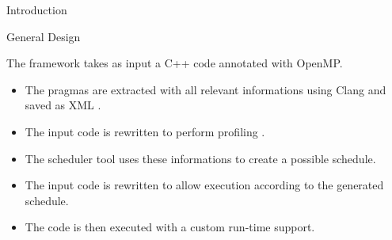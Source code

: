 \documentclass[xcolor=dvipsnames]{beamer}
\begin{document}
\begin{section}{Introduction}
\begin{frame}{\hskip 0.3cm General Design}

The framework takes as input a C++ code annotated with OpenMP.

\begin{itemize}

\item The pragmas are extracted with all relevant informations using Clang and saved as XML .

\item The input code is rewritten to perform profiling .

\item The scheduler tool uses these informations to create a possible schedule.

\item The input code is rewritten to allow execution according to the generated schedule.

\item The code is then executed with a custom run-time support.

\end{itemize}

\end{frame}











\begin{frame}{\hskip 0.3cm }



\end{frame}
\end{section}
\end{document}
